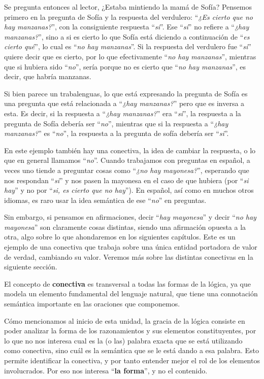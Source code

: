 Se pregunta entonces al lector, ¿Estaba mintiendo la mamá de Sofía? Pensemos
primero en la pregunta de Sofía y la respuesta del verdulero: ``\textit{¿Es
cierto que no hay manzanas?}'', con la consiguiente respuesta ``\textit{si}''.
Ese ``\textit{sí}'' no refiere a ``\textit{¿hay manzanas?}'', sino a si es
cierto lo que Sofía está diciendo a continuación de ``\textit{es cierto qué}'',
lo cual es ``\textit{no hay manzanas}''. Si la respuesta del verdulero fue
``\textit{si}'' quiere decir que es cierto, por lo que efectivamente
``\textit{no hay manzanas}'', mientras que si hubiera sido ``\textit{no}'',
sería porque no es cierto que ``\textit{no hay manzanas}'', es decir, que habría
manzanas.

Si bien parece un trabalenguas, lo que está expresando la pregunta de Sofía es
una pregunta que está relacionada a ``\textit{¿hay manzanas?}'' pero que es
inversa a esta. Es decir, si la respuesta a ``\textit{¿hay manzanas?}'' era
``\textit{si}'', la respuesta a la pregunta de Sofía debería ser
``\textit{no}'', mientras que si la respuesta a ``\textit{¿hay manzanas?}'' es
``\textit{no}'', la respuesta a la pregunta de sofía debería ser
``\textit{si}''.

En este ejemplo también hay una conectiva, la idea de cambiar la respuesta, o lo
que en general llamamos ``\textit{no}''. Cuando trabajamos con preguntas en
español, a veces uno tiende a preguntar cosas como ``\textit{¿no hay
mayonesa?}'', esperando que nos respondan ``\textit{si}'' y nos pasen la
mayonesa en el caso de que hubiera (por ``\textit{si hay}'' y no por
``\textit{si, es cierto que no hay}''). En español, así como en muchos otros
idiomas, es raro usar la idea semántica de ese ``\textit{no}'' en preguntas.

Sin embargo, si pensamos en afirmaciones, decir ``\textit{hay mayonesa}'' y
decir ``\textit{no hay mayonesa}'' son claramente cosas distintas, siendo una
afirmación opuesta a la otra, algo sobre lo que ahondaremos en los siguientes
capítulos. Este es un ejemplo de una conectiva que trabaja sobre una única
entidad portadora de valor de verdad, cambiando su valor. Veremos más sobre las
distintas conectivas en la siguiente sección.

El concepto de \textbf{conectiva} es transversal a todas las formas de la
lógica, ya que modela un elemento fundamental del lenguaje natural, que tiene
una connotación semántica importante en las oraciones que componemos.

Cómo mencionamos al inicio de esta unidad, la gracia de la lógica consiste en
poder analizar la forma de los razonamientos y sus elementos constituyentes, por
lo que no nos interesa cual es la (o las) palabra exacta que se está utilizando
como conectiva, sino cuál es la semántica que se le está dando a esa palabra.
Esto permite identificar la conectiva, y por tanto entender mejor el rol de los
elementos involucrados. Por eso nos interesa ``\textbf{la forma}'', y no el
contenido.

